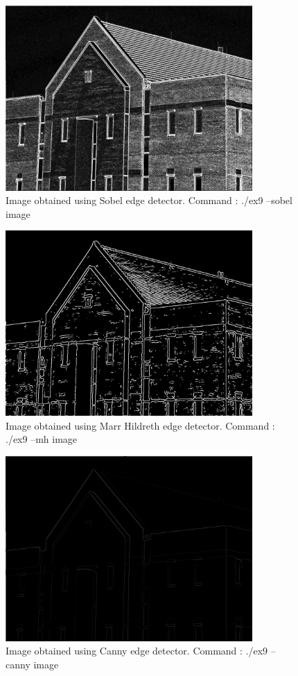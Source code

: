 \documentclass[10pt]{article}
\begin{document}
\begin{figure}[!ht]
	\centering
	\includegraphics[height=200pt]{./ex9/building_sobel.jpg}
	\caption{Image obtained using Sobel edge detector. Command : ./ex9 --sobel image}
\end{figure}
\begin{figure}[!ht]
	\centering
	\includegraphics[height=200pt]{./ex9/building_mh.jpg}
	\caption{Image obtained using Marr Hildreth edge detector. Command : ./ex9 --mh image}
\end{figure}
\begin{figure}[!ht]
	\centering
	\includegraphics[height=200pt]{./ex9/building_canny.jpg}
	\caption{Image obtained using Canny edge detector. Command : ./ex9 --canny image}
\end{figure}
\end{document}
